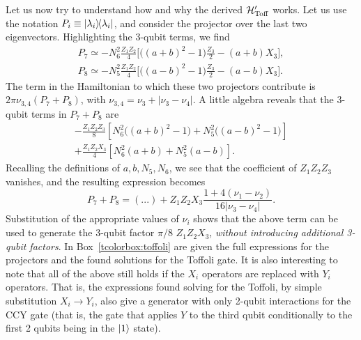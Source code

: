 Let us now try to understand how and why the derived $\mathcal{H}'_{\operatorname{Toff}}{}$ works.
Let us use the notation $P_i \equiv \ketbra{\lambda_i}$,
and consider the projector over the last two eigenvectors.
Highlighting the 3-qubit terms, we find
\begin{equation}
\begin{aligned}
	P_7 \simeq - N_6^2 \frac{Z_1 Z_2}{4} \bigg[
		\big((a + b)^2 - 1\big) \frac{Z_3}{2}
		- (a + b) X_3
	\bigg], \\
	P_8 \simeq - N_5^2 \frac{Z_1 Z_2}{4} \bigg[
		\big((a - b)^2 - 1\big) \frac{Z_3}{2}
		- (a - b) X_3
	\bigg].
\end{aligned}
\end{equation}
The term in the Hamiltonian to which these two projectors contribute is
$2\pi \nu_{3,4} (P_7 + P_8)$, with $\nu_{3,4} = \nu_3 + \lvert \nu_3 - \nu_4\rvert$.
A little algebra reveals that the 3-qubit terms in $P_7 + P_8$ are
\begin{equation}
\begin{aligned}
	- \frac{Z_1 Z_2 Z_3}{8} \left[
		N_6^2\big((a+b)^2 - 1\big)
		+ N_5^2 \big((a-b)^2 - 1\big)
	\right] \\
	+ \frac{Z_1 Z_2 X_3}{4} \left[
		N_6^2(a+b) + N_5^2(a-b)
	\right].
\end{aligned}
\end{equation}
Recalling the definitions of $a,b,N_5,N_6$, we see that the coefficient of $Z_1 Z_2 Z_3$ vanishes, and the resulting expression becomes
\begin{equation}
	P_7 + P_8 = (...) +
	Z_1 Z_2 X_3 \frac{1 + 4(\nu_1 - \nu_2)}{16\lvert \nu_3 - \nu_4\rvert}.
\end{equation}
Substitution of the appropriate values of $\nu_i$ shows that the above term can be used to generate the 3-qubit factor $\pi/8 \,\,Z_1 Z_2 X_3$,
\emph{without introducing additional 3-qubit factors}.
In Box~\ref{tcolorbox:toffoli} are given the full expressions for the projectors and the found solutions for the Toffoli gate.
It is also interesting to note that all of the above still holds if the $X_i$ operators are replaced with $Y_i$ operators.
That is, the expressions found solving for the Toffoli, by simple substitution $X_i \to Y_i$,
also give a generator with only 2-qubit interactions for the CCY gate
(that is, the gate that applies $Y$ to the third qubit conditionally to the first 2 qubits being in the $\ket1$ state).

